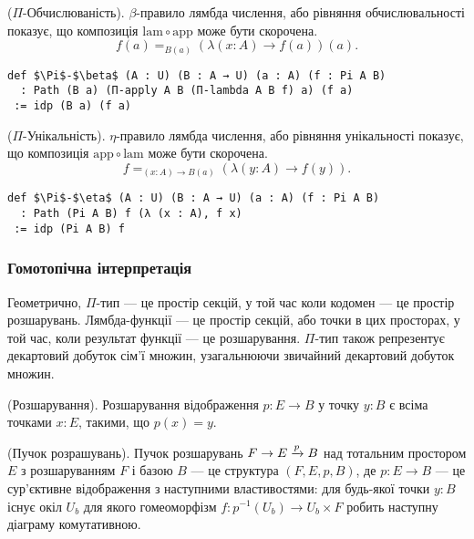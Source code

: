 \begin{theorem} ($\Pi$-Обчислюваність). $\beta$-правило лямбда числення, або рівняння
обчислювальності показує, що композиція $\mathrm{lam} \circ \mathrm{app}$ може бути скорочена.
$$f(a) =_{B(a)} (\lambda (x:A) \rightarrow f(a))(a).$$
\begin{lstlisting}
def $\Pi$-$\beta$ (A : U) (B : A → U) (a : A) (f : Pi A B)
  : Path (B a) (Π-apply A B (Π-lambda A B f) a) (f a)
 := idp (B a) (f a)
\end{lstlisting}
\end{theorem}

\begin{theorem} ($\Pi$-Унікальність). $\eta$-правило лямбда числення, або рівняння
унікальності показує, що композиція $\mathrm{app} \circ \mathrm{lam}$ може бути скорочена.
$$f =_{(x:A)\rightarrow B(a)} (\lambda (y:A) \rightarrow f(y)).$$
\begin{lstlisting}
def $\Pi$-$\eta$ (A : U) (B : A → U) (a : A) (f : Pi A B)
  : Path (Pi A B) f (λ (x : A), f x)
 := idp (Pi A B) f
\end{lstlisting}
\end{theorem}

\newpage

\subsubsection*{Гомотопічна інтерпретація}
Геометрично, $\Pi$-тип — це простір секцій, у той час коли кодомен — це простір розшарувань.
Лямбда-функції — це простір секцій, або точки в цих просторах, у той час, коли результат функції — це розшарування.
$\Pi$-тип також репрезентує декартовий добуток сім'ї множин, узагальнюючи звичайний декартовий добуток множин.

\begin{definition} (Розшарування).
Розшарування відображення $p: E \rightarrow B$ у точку $y: B$ є всіма точками $x: E$, такими, що $p(x)=y$.
\end{definition}

\begin{definition} (Пучок розрашувань).
Пучок розшарувань $ F \rightarrow E \xrightarrow{{p}} B$ над тотальним простором $E$ з розшаруванням $F$ і базою $B$ — це
структура $(F,E,p,B)$, де $p: E \rightarrow B$ — це сур'єктивне відображення з наступними властивостями:
для будь-якої точки $y: B$ існує окіл $U_b$ для якого гомеоморфізм $f: p^{-1}(U_b) \rightarrow U_b \times F$
робить наступну діаграму комутативною.
\begin{center}
\end{center}
\end{definition}

